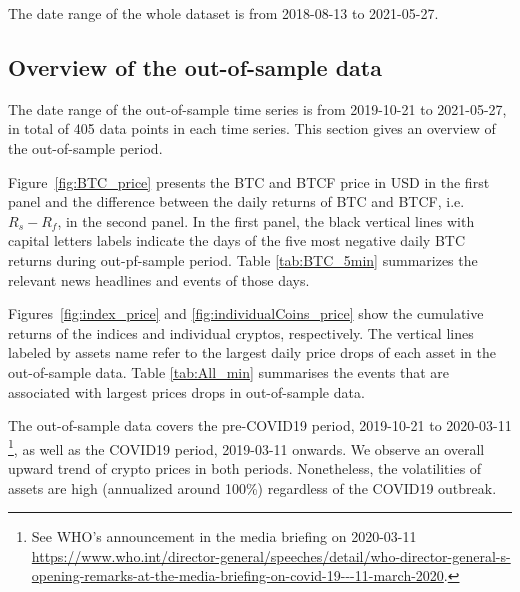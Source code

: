 The date range of the whole dataset is from 2018-08-13 to 2021-05-27. 


\subsection{Overview of the out-of-sample data}\label{subsec:oosdata}

The date range of the out-of-sample time series is from 2019-10-21 to
2021-05-27, in total of 405 data points in each time series. 
This section gives an overview of the out-of-sample period. 

Figure~\ref{fig:BTC_price} presents the BTC and BTCF price in USD in
the first panel and the difference between the daily returns of BTC and BTCF,
 i.e. $R_s - R_f$, in the second panel. 
In the first panel, the black vertical lines with capital letters
labels indicate the days of the five most negative daily BTC returns
during out-pf-sample period.
Table \ref{tab:BTC_5min} summarizes the relevant news headlines and
events of those days.  

Figures~\ref{fig:index_price} and \ref{fig:individualCoins_price} show
the cumulative returns of the indices and individual cryptos,
respectively.  The vertical lines labeled by assets name refer to the 
largest daily price drops of each asset in the out-of-sample data.  
Table \ref{tab:All_min} summarises the events that are associated with largest prices drops in 
out-of-sample data. 

The out-of-sample data covers the pre-COVID19 period, 2019-10-21 to
2020-03-11 \footnote{See WHO's announcement in the media briefing on 2020-03-11 \url{https://www.who.int/director-general/speeches/detail/who-director-general-s-opening-remarks-at-the-media-briefing-on-covid-19---11-march-2020}.}, as well as the COVID19 period, 2019-03-11 onwards. 
We observe an overall upward trend of crypto prices in both periods.
Nonetheless, the volatilities of assets are high (annualized around
100\%) regardless of the COVID19 outbreak. 

